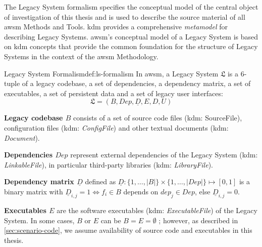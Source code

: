 The \gls{Legacy System} formalism specifies the conceptual model of the central object of investigation of this thesis and is used to describe the source material of all \gls{awsm} Methods and Tools.
\gls{kdm} \autocite{OMG2016KDM} provides a comprehensive \emph{\gls{metamodel}} for describing \glspl{Legacy System}.
\gls{awsm}'s conceptual model of a \gls{Legacy System} is based on \gls{kdm} concepts that provide the common foundation for the structure of \glspl{Legacy System} in the context of the \gls{awsm} Methodology.
\vspace{-15pt}
\begin{thesisdefinition}{Legacy System Formalism}{def:ls-formalism}
In \gls{awsm}, a \gls{Legacy System} \(\mathfrak{L}\) is a 6-tuple of a legacy codebase, a set of dependencies, a dependency matrix, a set of executables, a set of persistent data and a set of legacy user interfaces:
\begin{equation}\mathfrak{L} = (B, Dep, \underline D,  E, D, U)\label{eq:legacy-system}\end{equation}
\end{thesisdefinition}

\vspace{-5pt}
\textbf{Legacy codebase \(B\)} consists of a set of source code files (\gls{kdm}: SourceFile), configuration files (\gls{kdm}: \emph{ConfigFile}) and other textual documents (\gls{kdm}: \emph{Document}).

\textbf{Dependencies \(Dep\)} represent external dependencies of the \gls{Legacy System} (\gls{kdm}: \emph{LinkableFile}), in particular third-party libraries (\gls{kdm}: \emph{LibraryFile}).

\textbf{Dependency matrix \(\underline D\)} defined as \(\underline D: \{1,\ldots, |B|\} \times \{1,\ldots, |Dep|\} \mapsto [0,1]\) is a binary matrix with \(\underline D_{i,j} = 1 \Longleftrightarrow f_i \in B\) depends on \(dep_j \in Dep\), else \(\underline D_{i,j} = 0\).

\textbf{Executables \(E\)} are the software executables (\gls{kdm}: \emph{ExecutableFile}) of the \gls{Legacy System}.
In some cases, \(B\) or \(E\) can be \(B=E=\emptyset\) \autocite{Binkley2007b}; however, as described in \cref{sec:scenario-code}, we assume availability of source code and executables in this thesis.

